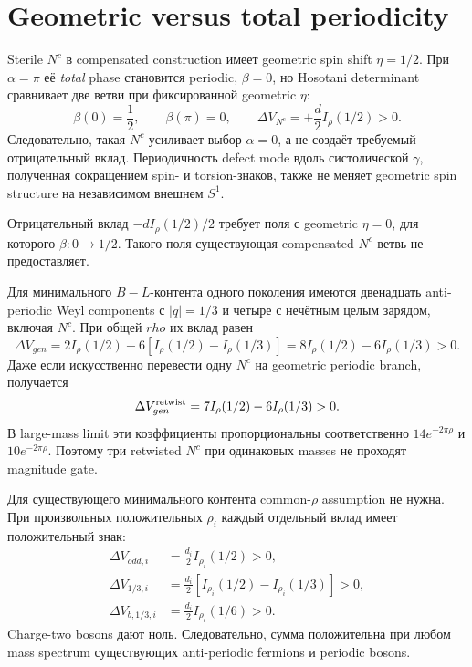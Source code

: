 \section{Geometric versus total periodicity}

Sterile \(N^c\) в compensated construction имеет geometric spin shift
\(\eta=1/2\). При \(\alpha=\pi\) её \emph{total} phase становится
periodic, \(\beta=0\), но Hosotani determinant сравнивает две ветви при
фиксированной geometric \(\eta\):
\begin{equation}
 \beta(0)=\frac12,
 \qquad
 \beta(\pi)=0,
 \qquad
 \Delta V_{N^c}=+\frac d2I_\rho(1/2)>0.
\end{equation}
Следовательно, такая \(N^c\) усиливает выбор \(\alpha=0\), а не создаёт
требуемый отрицательный вклад. Периодичность defect mode вдоль
систолической \(\gamma\), полученная сокращением spin- и torsion-знаков, также
не меняет geometric spin structure на независимом внешнем \(S^1\).

Отрицательный вклад
\(-dI_\rho(1/2)/2\) требует поля с geometric \(\eta=0\), для которого
\(\beta:0\to1/2\). Такого поля существующая compensated \(N^c\)-ветвь не
предоставляет.

Для минимального \(B-L\)-контента одного поколения имеются двенадцать
anti-periodic Weyl components с \(|q|=1/3\) и четыре с нечётным целым
зарядом, включая \(N^c\). При общей \(rho\) их вклад равен
\begin{equation}
 \Delta V_{gen}
 =2I_\rho(1/2)+6\left[I_\rho(1/2)-I_\rho(1/3)\right]
 =8I_\rho(1/2)-6I_\rho(1/3)>0.
\end{equation}
Даже если искусственно перевести одну \(N^c\) на geometric periodic branch,
получается
\begin{equation}
 \Delta V_{gen}^{\rm retwist}
 =7I_\rho(1/2)-6I_\rho(1/3)>0.
\end{equation}
В large-mass limit эти коэффициенты пропорциональны соответственно
\(14e^{-2\pi\rho}\) и \(10e^{-2\pi\rho}\). Поэтому три retwisted \(N^c\)
при одинаковых masses не проходят magnitude gate.

Для существующего минимального контента common-\(\rho\) assumption не
нужна. При произвольных положительных \(\rho_i\) каждый отдельный вклад имеет
положительный знак:
\begin{align}
 \Delta V_{odd,i}
 &=\frac{d_i}{2}I_{\rho_i}(1/2)>0,\\
 \Delta V_{1/3,i}
 &=\frac{d_i}{2}\left[
 I_{\rho_i}(1/2)-I_{\rho_i}(1/3)
 \right]>0,\\
 \Delta V_{b,1/3,i}
 &=\frac{d_i}{2}I_{\rho_i}(1/6)>0.
\end{align}
Charge-two bosons дают ноль. Следовательно, сумма положительна при любом
mass spectrum существующих anti-periodic fermions и periodic bosons.

